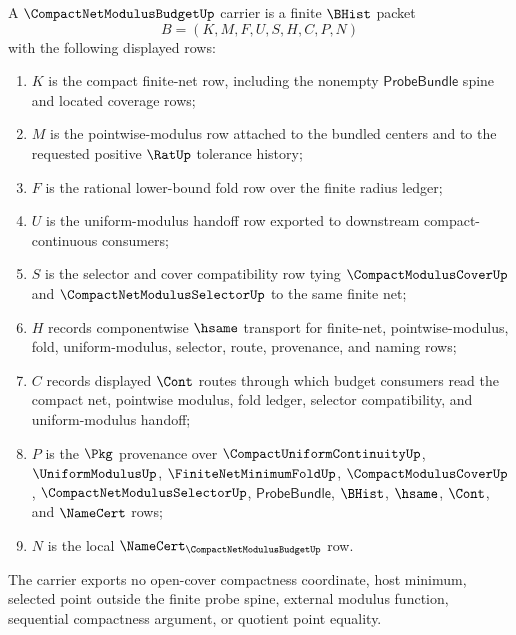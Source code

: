\begin{definition}
\label{def:compact-net-modulus-budget-carrier}
A $\CompactNetModulusBudgetUp$ carrier is a finite $\BHist$ packet
$$
B=(K,M,F,U,S,H,C,P,N)
$$
with the following displayed rows:
\begin{enumerate}
\item $K$ is the compact finite-net row, including the nonempty $\mathsf{ProbeBundle}$ spine and located coverage rows;
\item $M$ is the pointwise-modulus row attached to the bundled centers and to the requested positive $\RatUp$ tolerance history;
\item $F$ is the rational lower-bound fold row over the finite radius ledger;
\item $U$ is the uniform-modulus handoff row exported to downstream compact-continuous consumers;
\item $S$ is the selector and cover compatibility row tying $\CompactModulusCoverUp$ and $\CompactNetModulusSelectorUp$ to the same finite net;
\item $H$ records componentwise $\hsame$ transport for finite-net, pointwise-modulus, fold, uniform-modulus, selector, route, provenance, and naming rows;
\item $C$ records displayed $\Cont$ routes through which budget consumers read the compact net, pointwise modulus, fold ledger, selector compatibility, and uniform-modulus handoff;
\item $P$ is the $\Pkg$ provenance over $\CompactUniformContinuityUp$, $\UniformModulusUp$, $\FiniteNetMinimumFoldUp$, $\CompactModulusCoverUp$, $\CompactNetModulusSelectorUp$, $\mathsf{ProbeBundle}$, $\BHist$, $\hsame$, $\Cont$, and $\NameCert$ rows;
\item $N$ is the local $\NameCert_{\CompactNetModulusBudgetUp}$ row.
\end{enumerate}
The carrier exports no open-cover compactness coordinate, host minimum, selected point outside the finite probe spine, external modulus function, sequential compactness argument, or quotient point equality.
\end{definition}

